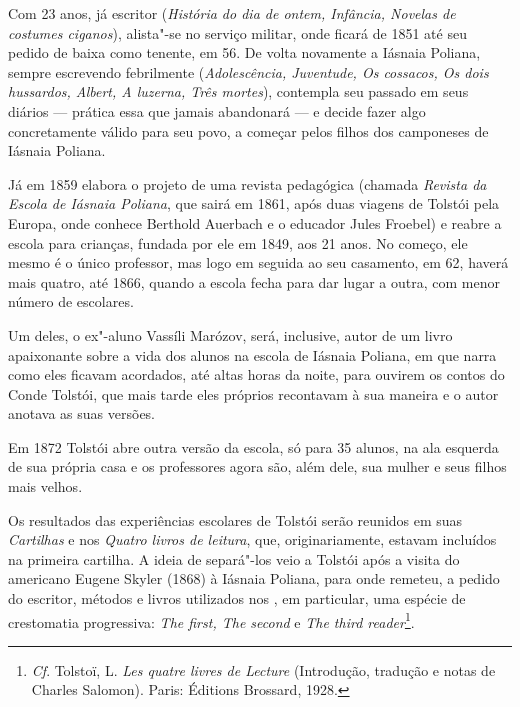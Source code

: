 {{Com 23 anos, já escritor (\emph{História do dia de ontem, Infância,
Novelas de costumes ciganos}), alista"-se no serviço militar, onde ficará
de 1851 até seu pedido de baixa como tenente, em 56. De volta novamente
a Iásnaia Poliana, sempre escrevendo febrilmente (\emph{Adolescência,
Juventude, Os cossacos, Os dois hussardos, Albert, A luzerna, Três
mortes}), contempla seu passado em seus diários --- prática essa que
jamais abandonará --- e decide fazer algo concretamente válido para seu
povo, a começar pelos filhos dos camponeses de Iásnaia Poliana.

Já em 1859 elabora o projeto de uma revista pedagógica
(chamada \emph{Revista da Escola de Iásnaia Poliana}, que sairá
em 1861, após duas viagens de Tolstói pela Europa, onde conhece Berthold
Auerbach e o educador Jules Froebel) e reabre a escola para crianças,
fundada por ele em 1849, aos 21 anos. No começo, ele mesmo é o
único professor, mas logo em seguida ao seu casamento, em 62, haverá
mais quatro, até 1866, quando a escola fecha para dar lugar a outra, com
menor número de escolares.

Um deles, o ex"-aluno Vassíli Marózov, será, inclusive, autor de um livro
apaixonante sobre a vida dos alunos na escola de Iásnaia
Poliana, em que narra como eles ficavam acordados, até altas horas da
noite, para ouvirem os contos do Conde Tolstói, que mais tarde eles
próprios recontavam à sua maneira e o autor anotava as suas
versões.

Em 1872 Tolstói abre outra versão da escola, só para 35 alunos, na ala esquerda de
sua própria casa e os professores agora são, além dele, sua mulher e
seus filhos mais velhos.

Os resultados das experiências escolares de Tolstói serão reunidos em
suas \emph{Cartilhas} e nos \emph{Quatro livros de leitura}, que,
originariamente, estavam incluídos na primeira cartilha. A ideia de
separá"-los veio a Tolstói após a visita do americano Eugene Skyler
(1868) à Iásnaia Poliana, para onde remeteu, a pedido do escritor,
métodos e livros utilizados nos , em particular, uma espécie de
crestomatia progressiva: \emph{The first, The second} e \emph{The third
reader}\footnote{\emph{Cf}. Tolstoï, L. \emph{Les quatre livres de
  Lecture} (Introdução, tradução e notas de Charles Salomon). Paris: Éditions
  Brossard, 1928.}.

}}
